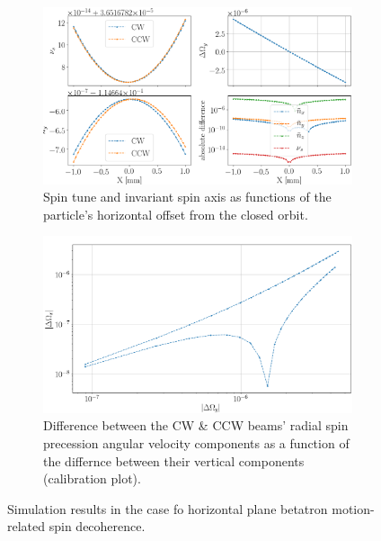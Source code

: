 \begin{figure}[h]
  \centering
  \begin{subfigure}{\linewidth}
    \includegraphics[width=\linewidth]{images/GFF/GFF_stune_range_X}
    \caption{Spin tune and invariant spin axis as functions of the particle's
      horizontal offset from the closed orbit.\label{fig:X:calib_plot:stune}}
  \end{subfigure}
  \begin{subfigure}{\linewidth}
    \includegraphics[width=\linewidth]{images/GFF/GFF_omegas_range_X}
    \caption{Difference between the CW \& CCW beams' radial spin precession angular velocity components
      as a function of the differnce between their vertical components
      (calibration plot).\label{fig:X:calib_plot:omegas}}
  \end{subfigure}    
  \caption{Simulation results in the case fo horizontal plane betatron motion-related
    spin decoherence.\label{fig:X:calib_plot}}
\end{figure}


